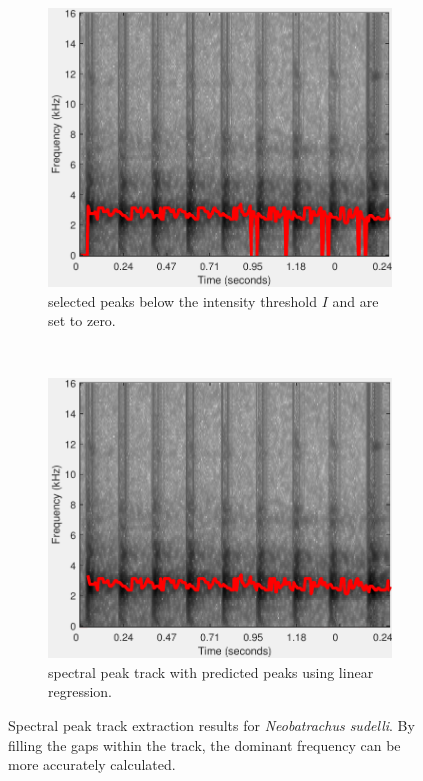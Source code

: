 \begin{figure}[htb!]
\centering
        \begin{subfigure}[b]{0.5\textwidth}
                \includegraphics[width=\textwidth]{image/Ch5/peak.pdf}
                \caption{selected peaks below the intensity threshold $I$ and are set to zero.}
        \end{subfigure}%
        \\ 
        \begin{subfigure}[b]{0.5\textwidth}
                \includegraphics[width=\textwidth]{image/Ch5/track.pdf}
                \caption{spectral peak track with predicted peaks using linear regression.}
        \end{subfigure}
        \caption[Spectral peak track extraction results]{Spectral peak track extraction results for \textit{Neobatrachus sudelli}. By filling the gaps within the track, the dominant frequency can be more accurately calculated.}       
        \label{fig:track}
\end{figure}

